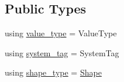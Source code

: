 \subsection*{Public Types}
\begin{DoxyCompactItemize}
\item 
using \hyperlink{structbc_1_1tensors_1_1exprs_1_1Kernel__Array_ae8195ebc960dd40b6c731a269c00e37b}{value\+\_\+type} = Value\+Type
\item 
using \hyperlink{structbc_1_1tensors_1_1exprs_1_1Kernel__Array_a3e7ac04624aaeb892ed9f2cf2f51c051}{system\+\_\+tag} = System\+Tag
\item 
using \hyperlink{structbc_1_1tensors_1_1exprs_1_1Kernel__Array_ae6a4db456a47818cda06bb76d05a3b6e}{shape\+\_\+type} = \hyperlink{structbc_1_1Shape}{Shape}
\end{DoxyCompactItemize}
